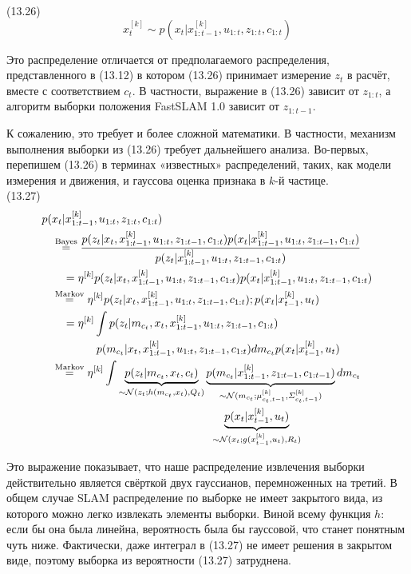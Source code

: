 \documentclass[10pt,a4paper]{article}
\begin{document}
(13.26)
$$x_t^{[k]}\sim p(x_t|x_{1:t-1}^{[k]},u_{1:t},z_{1:t},c_{1:t})$$

Это распределение отличается от предполагаемого распределения, представленного в (13.12) в котором (13.26) принимает измерение $z_t$ в расчёт, вместе с соответствием $c_t$. В частности, выражение в (13.26) зависит от $z_{1:t}$, а алгоритм выборки положения FastSLAM 1.0 зависит от $z_{1:t-1}$.

К сожалению, это требует и более сложной математики. В частности, механизм выполнения выборки из (13.26) требует дальнейшего анализа. Во-первых, перепишем (13.26) в терминах «известных» распределений, таких, как модели измерения и движения, и гауссова оценка признака в $k$-й частице.\\

(13.27)
\begin{equation*}
\begin{split}
p(&x_t|x_{1:t-1}^{[k]},u_{1:t},z_{1:t},c_{1:t})\\
&\overset{\text{Bayes}}{=}\frac{p(z_t|x_t,x_{1:t-1}^{[k]},u_{1:t},z_{1:t-1},c_{1:t})p(x_t|x_{1:t-1}^{[k]},u_{1:t},z_{1:t-1},c_{1:t})}{p(z_t|x_{1:t-1}^{[k]},u_{1:t},z_{1:t-1},c_{1:t})}\\
&\quad=\eta^{[k]}p(z_t|x_t,x_{1:t-1}^{[k]},u_{1:t},z_{1:t-1},c_{1:t})p(x_t|x_{1:t-1}^{[k]},u_{1:t},z_{1:t-1},c_{1:t})\\
&\overset{\text{Markov}}{=}\eta^{[k]}p(z_t|x_t,x_{1:t-1}^{[k]},u_{1:t},z_{1:t-1},c_{1:t});p(x_t|x_{t-1}^{[k]},u_t)\\
&\quad=\eta^{[k]}\int p(z_t|m_{c_t},x_t,x_{1:t-1}^{[k]},u_{1:t},z_{1:t-1},c_{1:t})\\
&\qquad\qquad p(m_{c_t}|x_t,x_{1:t-1}^{[k]},u_{1:t},z_{1:t-1},c_{1:t})dm_{c_t}p(x_t|x_{t-1}^{[k]},u_t)\\
&\overset{\text{Markov}}{=}\eta^{[k]}\int\underbrace{p(z_t|m_{c_t},x_t,c_t)}_{\sim\mathcal{N}(z_t;h(m_{c_t},x_t),Q_t)}\underbrace{p(m_{c_t}|x_{1:t-1}^{[k]},z_{1:t-1},c_{1:t-1})}_{\sim\mathcal{N}(m_{c_t};\mu_{c_t,t-1}^{[k]},\varSigma_{c_t,t-1}^{[k]})}dm_{c_t}\\
&\hspace{50mm}\underbrace{p(x_t|x_{t-1}^{[k]},u_t)}_{\sim\mathcal{N}(x_t;g(x_{t-1}^{[k]},u_t),R_t)}
\end{split}
\end{equation*}

Это выражение показывает, что наше распределение извлечения выборки действительно является свёрткой двух гауссианов, перемноженных на третий. В общем случае SLAM распределение по выборке не имеет закрытого вида, из которого можно легко извлекать элементы выборки. Виной всему функция $h$: если бы она была линейна, вероятность была бы гауссовой, что станет понятным чуть ниже. Фактически, даже интеграл в (13.27) не имеет решения в закрытом виде, поэтому выборка из вероятности (13.27) затруднена.
\end{document}
